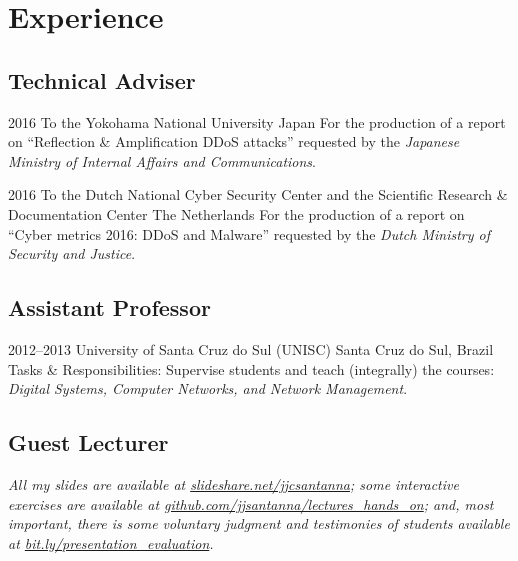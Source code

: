 \documentclass[print]{styles/friggeri-cv-linux} %
\begin{document}
\section{Experience}\vspace{-5pt}
\subsection{Technical Adviser}\vspace{-5pt}
\begin{entrylist}
\entry
{2016}
{To the Yokohama National University}
{Japan}
{For the production of a report on ``Reflection \& Amplification DDoS attacks''
requested by the \emph{Japanese Ministry of Internal Affairs and
Communications}.}

\entry
{2016}
{To the Dutch National Cyber Security Center and the Scientific Research \& Documentation Center}
{The Netherlands}
{For the production of a report on ``Cyber metrics 2016: DDoS and Malware''
requested by the \emph{Dutch Ministry of Security and Justice}.} \end{entrylist}

\subsection{Assistant Professor}\vspace{-5pt}
\begin{entrylist}
\entry
{2012--2013}
{University of Santa Cruz do Sul (UNISC)}
{Santa Cruz do Sul, Brazil}
{Tasks \& Responsibilities: Supervise students and teach (integrally) the courses: \textit{Digital
Systems, Computer Networks, and Network Management}.} 
\end{entrylist}

\subsection{Guest Lecturer}\vspace{-5pt}

\textit{All my slides are available at
\href{http://www.slideshare.net/jjcsantanna}{slideshare.net/jjcsantanna}; some
interactive exercises are available at
\href{https://github.com/jjsantanna/lectures_hands_on}{github.com/jjsantanna/lectures\_hands\_on};
and, most important, there is some voluntary judgment and testimonies of students
available at
\href{http://bit.ly/presentation_evaluation}{bit.ly/presentation\_evaluation}.}
\end{document}
